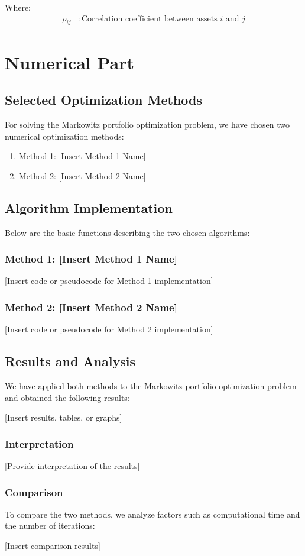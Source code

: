 \documentclass[12pt]{article}
\begin{document}
Where:
\begin{align*}
    \rho_{ij} & : \text{Correlation coefficient between assets } i \text{ and } j
\end{align*}

\section*{Numerical Part}

\subsection*{Selected Optimization Methods}

For solving the Markowitz portfolio optimization problem, we have chosen two numerical optimization methods:

\begin{enumerate}
    \item Method 1: [Insert Method 1 Name]
    \item Method 2: [Insert Method 2 Name]
\end{enumerate}

\subsection*{Algorithm Implementation}

Below are the basic functions describing the two chosen algorithms:

\subsubsection*{Method 1: [Insert Method 1 Name]}

[Insert code or pseudocode for Method 1 implementation]

\subsubsection*{Method 2: [Insert Method 2 Name]}

[Insert code or pseudocode for Method 2 implementation]

\subsection*{Results and Analysis}

We have applied both methods to the Markowitz portfolio optimization problem and obtained the following results:

[Insert results, tables, or graphs]

\subsubsection*{Interpretation}

[Provide interpretation of the results]

\subsubsection*{Comparison}

To compare the two methods, we analyze factors such as computational time and the number of iterations:

[Insert comparison results]
\end{document}
